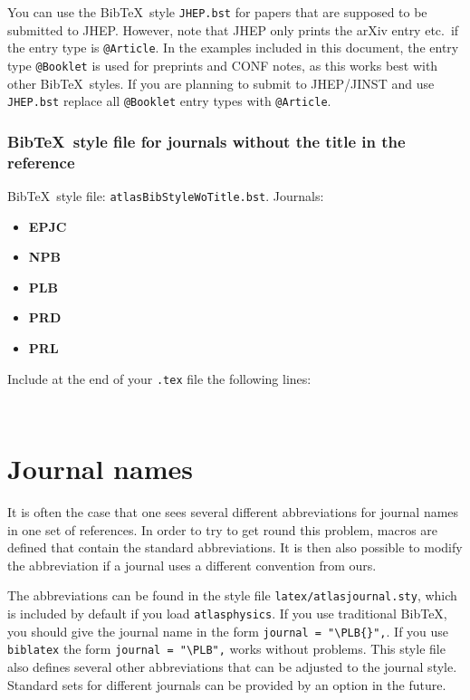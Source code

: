 \documentclass[UKenglish,texlive=2013]{latex/atlasdoc}
\newcommand*{\BibTeX}{Bib\TeX}
\newcommand{\File}[1]{\texttt{#1}\xspace}
\newcommand{\Package}[1]{\texttt{#1}\xspace}
\begin{document}
You can use the \BibTeX\ style \File{JHEP.bst} for papers that are supposed to be submitted to JHEP.
However, note that JHEP only prints the arXiv entry etc.\ if the entry type is \texttt{@Article}.
In the examples included in this document,
the entry type \texttt{@Booklet} is used for preprints and CONF notes,
as this works best with other \BibTeX\ styles.
If you are planning to submit to JHEP/JINST and use \File{JHEP.bst} 
replace all \texttt{@Booklet} entry types with \texttt{@Article}.


\subsubsection{\BibTeX\ style file for journals without the title in the reference}

\BibTeX\ style file: \Package{atlasBibStyleWoTitle.bst}.
Journals:
\begin{itemize}\setlength{\parskip}{0pt}\setlength{\itemsep}{0pt}
\item \textbf{EPJC}
\item \textbf{NPB}
\item \textbf{PLB}
\item \textbf{PRD}
\item \textbf{PRL}
\end{itemize}
\noindent Include at the end of your \File{.tex} file the following lines:
\begin{verbatim}


\end{verbatim}


\section{Journal names}

It is often the case that one sees several different abbreviations for journal
names in one set of references.
In order to try to get round this problem, macros are defined that
contain the standard abbreviations.
It is then also possible to modify the abbreviation if a journal uses a different convention from ours.

The abbreviations can be found in the style file \File{latex/atlasjournal.sty},
which is included by default if you load \Package{atlasphysics}.
If you use traditional \BibTeX, you should give the journal name in the form
\verb|journal = "\PLB{}",|. 
If you use \Package{biblatex} the form \verb|journal = "\PLB",| works without problems.
This style file also defines several other abbreviations that can be adjusted to the
journal style. 
Standard sets for different journals can be provided by an option in the future.
\end{document}
